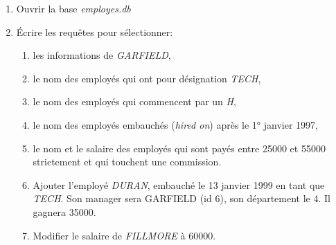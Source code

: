 \documentclass[a4paper,11pt]{article}
\begin{document}
\begin{Form}
\begin{exo}
\begin{enumerate}
\begin{enumerate}
\end{enumerate} 
\end{enumerate}
\end{exo}
\begin{exo}
\begin{enumerate}
\item Ouvrir la base \emph{employes.db}
\item Écrire les requêtes pour sélectionner:
\begin{enumerate}
\item les informations de \emph{GARFIELD},
\item le nom des employés qui ont pour désignation \emph{TECH},
\item le nom des employés qui commencent par un \emph{H},
\item le nom des employés embauchés (\emph{hired on}) après le 1° janvier 1997,
\item le nom et le salaire des employés qui sont payés entre 25000 et 55000 strictement et qui touchent une commission.
\item Ajouter l'employé \emph{DURAN}, embauché le 13 janvier 1999 en tant que \emph{TECH}. Son manager sera GARFIELD (id 6), son département le 4. Il gagnera 35000.
\item Modifier le salaire de \emph{FILLMORE} à 60000.
\end{enumerate} 
\end{enumerate}
\end{exo}
\end{Form}
\end{document}
